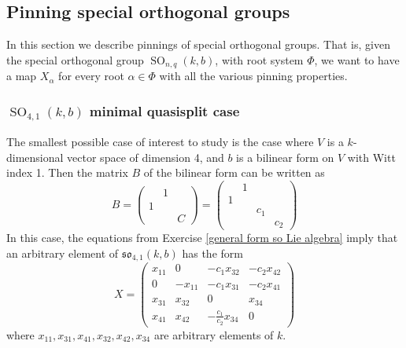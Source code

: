 \documentclass[12pt]{article}
\theoremstyle{definition}
\numberwithin{theorem}{subsection}
\DeclareMathOperator{\SO}{SO}
\begin{document}
\subsection{Pinning special orthogonal groups}

In this section we describe pinnings of special orthogonal groups. That is, given the special orthogonal group $\SO_{n,q}(k,b)$, with root system $\Phi$, we want to have a map $X_\alpha$ for every root $\alpha \in \Phi$ with all the various pinning properties.

\subsubsection{$\SO_{4,1}(k,b)$ minimal quasisplit case}

The smallest possible case of interest to study is the case where $V$ is a $k$-dimensional vector space of dimension 4, and $b$ is a bilinear form on $V$ with Witt index 1. Then the matrix $B$ of the bilinear form can be written as
\[
	B =
	\begin{pmatrix}
		& 1 \\
		1 & \\
		&& C
	\end{pmatrix}
	=
	\begin{pmatrix}
		& 1 \\
		1 & \\
		&& c_1 \\
		&&& c_2
	\end{pmatrix}
\]
In this case, the equations from Exercise \ref{general form so Lie algebra} imply that an arbitrary element of $\mathfrak{so}_{4,1}(k,b)$ has the form
\[
	X = \begin{pmatrix}
		x_{11} & 0 & -c_1 x_{32}  & -c_2 x_{42} \\
		0 & -x_{11} & -c_1 x_{31} & -c_2 x_{41} \\
		x_{31} & x_{32} & 0 & x_{34} \\
		x_{41} & x_{42} & - \frac{c_1}{c_2} x_{34} & 0
	\end{pmatrix}
\]
where $x_{11}, x_{31}, x_{41}, x_{32}, x_{42}, x_{34}$ are arbitrary elements of $k$.
\end{document}
